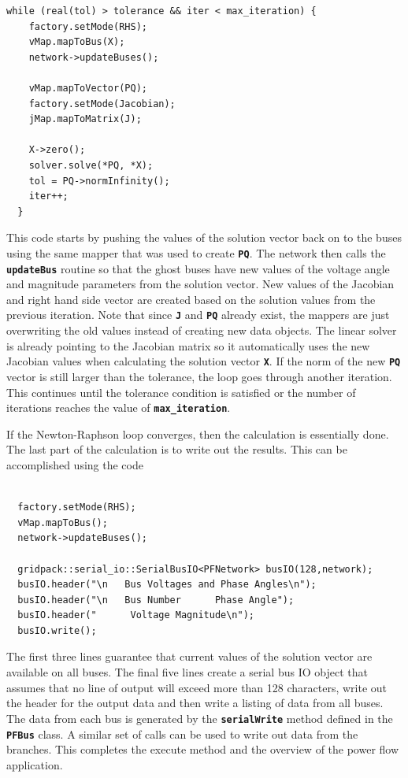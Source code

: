 {
\color{red}
\begin{Verbatim}[fontseries=b]
  while (real(tol) > tolerance && iter < max_iteration) {
    factory.setMode(RHS);
    vMap.mapToBus(X);
    network->updateBuses();

    vMap.mapToVector(PQ);
    factory.setMode(Jacobian);
    jMap.mapToMatrix(J);

    X->zero();
    solver.solve(*PQ, *X);
    tol = PQ->normInfinity();
    iter++;
  }
\end{Verbatim}
}

This code starts by pushing the values of the solution vector back on to the buses using the same mapper that was used to create \texttt{\textbf{PQ}}. The network then calls the \texttt{\textbf{updateBus}} routine so that the ghost buses have new values of the voltage angle and magnitude parameters from the solution vector. New values of the Jacobian and right hand side vector are created based on the solution values from the previous iteration. Note that since \texttt{\textbf{J}} and \texttt{\textbf{PQ}} already exist, the mappers are just overwriting the old values instead of creating new data objects. The linear solver is already pointing to the Jacobian matrix so it automatically uses the new Jacobian values when calculating the solution vector \texttt{\textbf{X}}. If the norm of the new \texttt{\textbf{PQ}} vector is still larger than the tolerance, the loop goes through another iteration. This continues until the tolerance condition is satisfied or the number of iterations reaches the value of \texttt{\textbf{max\_iteration}}.

If the Newton-Raphson loop converges, then the calculation is essentially done. The last part of the calculation is to write out the results. This can be accomplished using the code

{
\color{red}
\begin{Verbatim}[fontseries=b]

  factory.setMode(RHS);
  vMap.mapToBus();
  network->updateBuses();

  gridpack::serial_io::SerialBusIO<PFNetwork> busIO(128,network);
  busIO.header("\n   Bus Voltages and Phase Angles\n");
  busIO.header("\n   Bus Number      Phase Angle");
  busIO.header("      Voltage Magnitude\n");
  busIO.write();
\end{Verbatim}
}

The first three lines guarantee that current values of the solution vector are available on all buses. The final five lines create a serial bus IO object that assumes that no line of output will exceed more than 128 characters, write out the header for the output data and then write a listing of data from all buses. The data from each bus is generated by the \texttt{\textbf{serialWrite}} method defined in the \texttt{\textbf{PFBus}} class. A similar set of calls can be used to write out data from the branches. This completes the execute method and the overview of the power flow application.
\newline
\hyperlink{topDoc}{\color{blue}{Top}}
